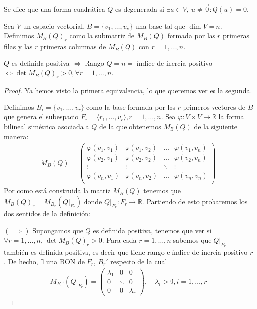 \documentclass[14pt]{book}
\begin{document}
\begin{dfn}
	Se dice que una forma cuadrática $Q$ es degenerada si $\exists u \in V,\ u ≠ \vec{0}: Q(u) = 0$.
\end{dfn}

\begin{tm}
	Sea $V$ un espacio vectorial, $B = \{v_1, \dots, v_n\}$ una base tal que $\dim V = n$. Definimos $M_B(Q)_r$ como la submatriz de $M_B(Q)$ formada por las $r$ primeras filas y las $r$ primeras columnas de $M_B(Q)$ con $r = 1, \dots, n$.
	
	$Q$ es definida positiva $\iff$ Rango $Q = n = $ índice de inercia positivo $\iff \det M_B(Q)_r > 0, \forall r = 1, \dots, n$.
\end{tm}

\begin{proof}
	Ya hemos visto la primera equivalencia, lo que queremos ver es la segunda.
	
	Definimos $B_r = \{v_1, \dots, v_r\}$ como la base formada por los $r$ primeros vectores de $B$ que genera el subespacio $F_r = \langle r_1, \dots, v_r \rangle, r = 1, \dots, n$. Sea $\varphi : V\times V \to \mathbb{R}$ la forma bilineal simétrica asociada a $Q$ de la que obtenemos $M_B(Q)$ de la siguiente manera:
	\begin{align*}
	M_B(Q) = \left(\begin{array}{cccc}
	\varphi(v_1, v_1) & \varphi(v_1, v_2) & \dots & \varphi(v_1, v_n) \\
	\varphi(v_2, v_1) & \varphi(v_2, v_2) & \dots & \varphi(v_2, v_n) \\
	\vdots & \vdots & \ddots & \vdots \\
	\varphi(v_n, v_1) & \varphi(v_n, v_2) & \dots & \varphi(v_n, v_n) \\
	\end{array}\right)
	\end{align*}
	Por como está construida la matriz $M_B(Q)$ tenemos que $M_B(Q)_r = M_{B_r}(Q\vert_{F_r})$ donde $Q\vert_{F_r} : F_r \to \mathbb{R}$. Partiendo de esto probaremos los dos sentidos de la definición:
	
	$(\implies)$ Supongamos que $Q$ es definida positiva, tenemos que ver si $\forall r = 1, \dots, n,\ \det M_B(Q)_r > 0$. Para cada $r = 1, \dots, n$ sabemos que $Q\vert_{F_r}$ también es definida positiva, es decir que tiene rango e índice de inercia positivo $r$. De hecho, $\exists$ una BON de $F_r$, $B_r'$ respecto de la cual
	\begin{align*}
		M_{B_r'}(Q\vert_{F_r}) = \left(\begin{array}{ccc}
		\lambda_1 & 0 & 0 \\
		0 & \ddots & 0 \\
		0 & 0 & \lambda_r
		\end{array}\right),\quad \lambda_i > 0, i = 1, \dots, r
	\end{align*}
	

\end{proof}
\end{document}

